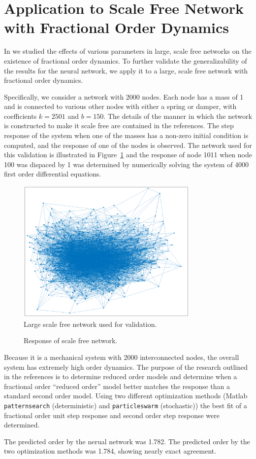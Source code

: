 \section{Application to Scale Free Network with Fractional Order Dynamics}

In \cite{goodwinemed2023,goodwinemmar2023} we studied the effects of various
parameters in large, scale free networks on the existence of fractional order
dynamics. To further validate the generalizability of the results for the neural
network, we apply it to a large, scale free network with fractional order
dynamics.

Specifically, we consider a network with 2000 nodes. Each node has a mass of 1
and is connected to various other nodes with either a spring or damper, with
coefficients $k = 2501$ and $b = 150$. The details of the manner in which the
network is constructed to make it scale free are contained in the references.
The step response of the system when one of the masses has a non-zero initial
condition is computed, and the response of one of the nodes is observed. The
network used for this validation is illustrated in Figure~\ref{fig:network} and
the response of node 1011 when node 100 was dispaced by 1 was determined by
numerically solving the system of 4000 first order differential equations.

\begin{figure}
\centering
\includegraphics[width=3.5in]{network}
\caption{Large scale free network used for validation.}
\label{fig:network}
\end{figure}

\begin{figure}
\centering

\vspace*{-5pt}
\caption{Response of scale free network.}
\label{fig:sfresp}
\end{figure}

Because it is a mechanical system with 2000 interconnected nodes, the overall
system has extremely high order dynamics. The purpose of the research outlined
in the references is to determine reduced order models and determine when a
fractional order ``reduced order'' model better matches the response than a
standard second order model. Using two different optimization methods (Matlab
\texttt{patternsearch} (deterministic) and \texttt{particleswarm} (stochastic))
the best fit of a fractional order unit step response and second order step
response were determined.

The predicted order by the nerual network was 1.782. The predicted order by the
two optimization methods was 1.784, showing nearly exact agreement.
